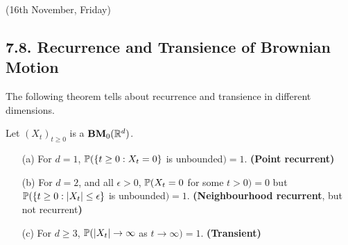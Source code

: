 \documentclass[12pt,a4paper]{report}
\begin{document}
\newday

(16th November, Friday)
\s

\subsection*{7.8. Recurrence and Transience of Brownian Motion}

The following theorem tells about recurrence and transience in different dimensions.
\s

 Let $(X_t)_{t\geq 0}$ is a $\textbf{BM}_0(\mathbb{R}^d)$.
\begin{itemize}
\item[(a)] For $d=1$, $\mathbb{P}(\{t\geq 0 : X_t =0 \}$ is unbounded$) =1$. \textbf{(Point recurrent)}
\item[(b)] For $d=2$, and all $\epsilon>0$, $\mathbb{P} (X_t =0$ for some $t>0) =0$ but $\mathbb{P}(\{ t\geq 0 : |X_t| \leq \epsilon \}$ is unbounded$)=1$. \textbf{(Neighbourhood recurrent}, but not recurrent\textbf{)}
\item[(c)] For $d\geq 3$, $\mathbb{P}(|X_t| \rightarrow \infty$ as $t\rightarrow \infty ) =1$. \textbf{(Transient)}
\end{itemize}
\end{document}
